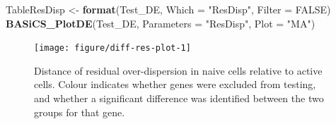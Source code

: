 \documentclass[9pt,a4paper,]{extarticle}
\newenvironment{Shaded}{\begin{snugshade}}{\end{snugshade}}
\newcommand{\DataTypeTok}[1]{\textcolor[rgb]{0.13,0.29,0.53}{#1}}
\newcommand{\KeywordTok}[1]{\textcolor[rgb]{0.13,0.29,0.53}{\textbf{#1}}}
\newcommand{\NormalTok}[1]{#1}
\newcommand{\OtherTok}[1]{\textcolor[rgb]{0.56,0.35,0.01}{#1}}
\newcommand{\StringTok}[1]{\textcolor[rgb]{0.31,0.60,0.02}{#1}}
\begin{document}
\begin{Shaded}
\begin{Highlighting}[]
\NormalTok{TableResDisp <-}\StringTok{ }\KeywordTok{format}\NormalTok{(Test_DE, }\DataTypeTok{Which =} \StringTok{"ResDisp"}\NormalTok{, }\DataTypeTok{Filter =} \OtherTok{FALSE}\NormalTok{)}
\KeywordTok{BASiCS_PlotDE}\NormalTok{(Test_DE, }\DataTypeTok{Parameters =} \StringTok{"ResDisp"}\NormalTok{, }\DataTypeTok{Plot =} \StringTok{"MA"}\NormalTok{)}
\end{Highlighting}
\end{Shaded}

\begin{figure}

{\centering \texttt{[image: figure/diff-res-plot-1]} 

}

\caption{Distance of residual over-dispersion in naive cells relative to active cells. Colour indicates whether genes were excluded from testing, and whether a significant difference was identified between the two groups for that gene.}\label{fig:diff-res-plot}
\end{figure}

{\small}
\end{document}
